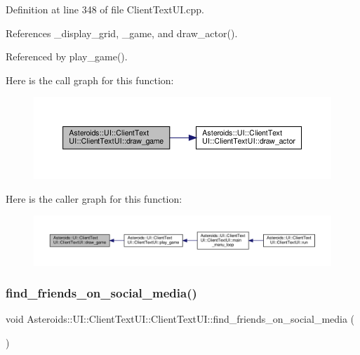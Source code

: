 Definition at line 348 of file Client\+Text\+U\+I.\+cpp.



References \+\_\+display\+\_\+grid, \+\_\+game, and draw\+\_\+actor().



Referenced by play\+\_\+game().

Here is the call graph for this function\+:\nopagebreak
\begin{figure}[H]
\begin{center}
\leavevmode
\includegraphics[width=350pt]{classAsteroids_1_1UI_1_1ClientTextUI_1_1ClientTextUI_a68028ff6a5b6d38321496c83ff872158_cgraph}
\end{center}
\end{figure}
Here is the caller graph for this function\+:\nopagebreak
\begin{figure}[H]
\begin{center}
\leavevmode
\includegraphics[width=350pt]{classAsteroids_1_1UI_1_1ClientTextUI_1_1ClientTextUI_a68028ff6a5b6d38321496c83ff872158_icgraph}
\end{center}
\end{figure}
\mbox{\label{classAsteroids_1_1UI_1_1ClientTextUI_1_1ClientTextUI_ac6ed983203b9d88a3a7d532eeceac524}} 
\subsubsection{\texorpdfstring{find\+\_\+friends\+\_\+on\+\_\+social\+\_\+media()}{find\_friends\_on\_social\_media()}}
{\footnotesize\ttfamily void Asteroids\+::\+U\+I\+::\+Client\+Text\+U\+I\+::\+Client\+Text\+U\+I\+::find\+\_\+friends\+\_\+on\+\_\+social\+\_\+media (\begin{DoxyParamCaption}{ }\end{DoxyParamCaption})\hspace{0.3cm}{\ttfamily [private]}}

